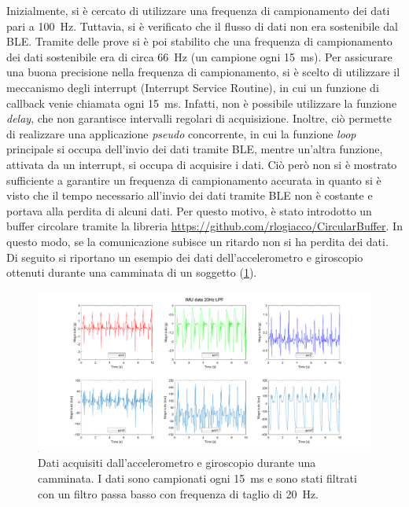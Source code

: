 Inizialmente, si è cercato di utilizzare una frequenza di campionamento dei dati pari a \SI{100}{\hertz}. Tuttavia, si è verificato che il flusso di dati non era sostenibile dal BLE. Tramite delle prove si è poi stabilito che una frequenza di campionamento dei dati sostenibile era di circa \SI{66}{\hertz} (un campione ogni \SI{15}{\milli\second}). Per assicurare una buona precisione nella frequenza di campionamento, si è scelto di utilizzare il meccanismo degli interrupt (Interrupt Service Routine), in cui un funzione di callback venie chiamata ogni \SI{15}{\milli\second}. Infatti, non è possibile utilizzare la funzione \textit{delay}, che non garantisce intervalli regolari di acquisizione. Inoltre, ciò permette di realizzare una applicazione \textit{pseudo} concorrente, in cui la funzione \textit{loop} principale si occupa dell'invio dei dati tramite BLE, mentre un'altra funzione, attivata da un interrupt, si occupa di acquisire i dati. Ciò però non si è mostrato sufficiente a garantire un frequenza di campionamento accurata in quanto si è visto che il tempo necessario all'invio dei dati tramite BLE non è costante e portava alla perdita di alcuni dati.  
Per questo motivo, è stato introdotto un buffer circolare tramite la libreria \url{https://github.com/rlogiacco/CircularBuffer}. In questo modo, se la comunicazione subisce un ritardo non si ha perdita dei dati. Di seguito si riportano un esempio dei dati dell'accelerometro e giroscopio ottenuti durante una camminata di un soggetto (\Fig\ref{fig:imu_data}).
\begin{figure}[tbh]
	\centering
	\includegraphics[width=1\linewidth]{./ImageFiles/IMU_data_example.pdf}
	\caption{Dati acquisiti dall'accelerometro e giroscopio durante una camminata. I dati sono campionati ogni \SI{15}{\milli\second} e sono stati filtrati con un filtro passa basso con frequenza di taglio di \SI{20}{\hertz}.}
	\label{fig:imu_data}
\end{figure}
